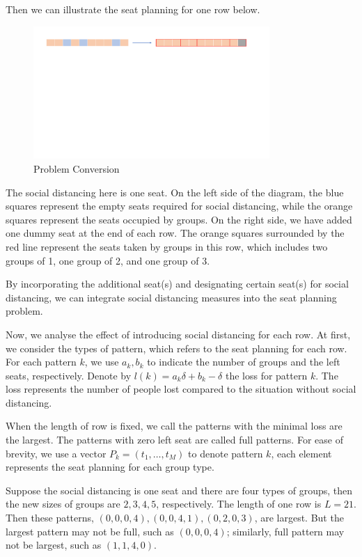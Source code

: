 Then we can illustrate the seat planning for one row below. 

\begin{figure}[ht]
    \centering
    \includegraphics[width = 0.8\textwidth]{./Figures/dummy_seat.pdf}
    \caption{Problem Conversion}
\end{figure}

The social distancing here is one seat. On the left side of the diagram, the blue squares represent the empty seats required for social distancing, while the orange squares represent the seats occupied by groups. On the right side, we have added one dummy seat at the end of each row. The orange squares surrounded by the red line represent the seats taken by groups in this row, which includes two groups of 1, one group of 2, and one group of 3.

By incorporating the additional seat(s) and designating certain seat(s) for social distancing, we can integrate social distancing measures into the seat planning problem.


Now, we analyse the effect of introducing social distancing for each row. At first, we consider the types of pattern, which refers to the seat planning for each row. For each pattern $k$, we use $a_k, b_k$ to indicate the number of groups and the left seats, respectively. Denote by $l(k) = a_k \delta + b_k - \delta$ the loss for pattern $k$. The loss represents the number of people lost compared to the situation without social distancing.

When the length of row is fixed, we call the patterns with the minimal loss are the largest. The patterns with zero left seat are called full patterns. For ease of brevity, we use a vector $P_{k} = (t_1, \ldots, t_M)$ to denote pattern $k$, each element represents the seat planning for each group type.

\begin{example}
  Suppose the social distancing is one seat and there are four types of groups, then the new sizes of groups are $2, 3, 4, 5$, respectively. The length of one row is $L = 21$. Then these patterns, $(0, 0, 0, 4), (0, 0, 4, 1), (0, 2, 0, 3)$, are largest. But the largest pattern may not be full, such as $(0, 0, 0, 4)$; similarly, full pattern may not be largest, such as $(1,1,4,0)$.
\end{example}


